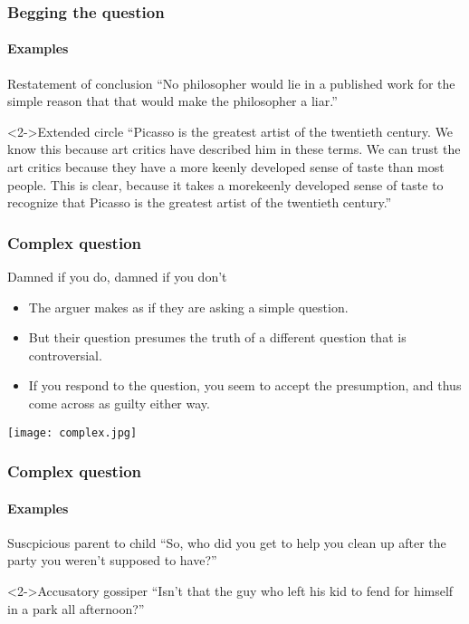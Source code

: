 \documentclass[10pt,letterpaper,xcolor=dvipsnames]{beamer}
\begin{document}
\begin{frame}
  \frametitle{Begging the question}
  \framesubtitle{Examples}
  
  \begin{block}{Restatement of conclusion}
    ``No philosopher would lie in a published work for the simple reason that that would make the philosopher a liar.''
  \end{block}
  
  \begin{block}<2->{Extended circle}
    ``Picasso is the greatest artist of the twentieth century.  We know this because art critics have described him in these terms. We can trust the art critics because they have a more keenly developed sense of taste than most people. This is clear, because it takes a morekeenly developed sense of taste to recognize that Picasso is the greatest artist of the twentieth century.''
  \end{block}
  
\end{frame}

\begin{frame}
  \frametitle{Complex question}
  
  \begin{block}{Damned if you do, damned if you don't}
    \begin{itemize}
      \item The arguer makes as if they are asking a simple question.
      \item But their question presumes the truth of a different question that is controversial.
      \item If you respond to the question, you seem to accept the presumption, and thus come across as guilty either way.
    \end{itemize}
  \end{block}
  
  
  \begin{center}
    \texttt{[image: complex.jpg]}
  \end{center}
  
\end{frame}

\begin{frame}
  \frametitle{Complex question}
  \framesubtitle{Examples}
  
  \begin{block}{Suscpicious parent to child}
    ``So, who did you get to help you clean up after the party you weren't supposed to have?''
  \end{block}
  
  \begin{block}<2->{Accusatory gossiper}
    ``Isn't that the guy who left his kid to fend for himself in a park all afternoon?''
  \end{block}
  
\end{frame}
\end{document}
